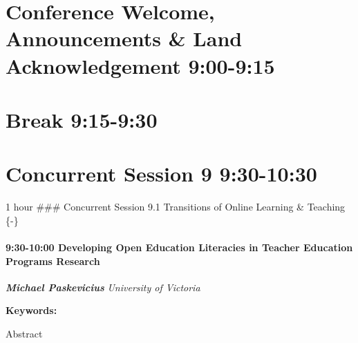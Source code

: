 \documentclass[
]{book}
\begin{document}
\hypertarget{conference-welcome-announcements-land-acknowledgement-900-915-1}{%
\section*{Conference Welcome, Announcements \& Land Acknowledgement \textbar{} 9:00-9:15}\label{conference-welcome-announcements-land-acknowledgement-900-915-1}}

\hypertarget{break-915-930-1}{%
\section*{Break \textbar{} 9:15-9:30}\label{break-915-930-1}}

\hypertarget{concurrent-session-9-930-1030}{%
\section*{Concurrent Session 9 \textbar{} 9:30-10:30}\label{concurrent-session-9-930-1030}}

1 hour
\#\#\# Concurrent Session 9.1 \textbar{} Transitions of Online Learning \& Teaching \{-\}

\begin{session}
\hypertarget{developing-open-education-literacies-in-teacher-education-programs-research}{%
\paragraph*{\texorpdfstring{9:30-10:00 \textbar{} \textbf{Developing
Open Education Literacies in Teacher Education Programs} \textbar{}
Research}{9:30-10:00 \textbar{} Developing Open Education Literacies in Teacher Education Programs \textbar{} Research}}\label{developing-open-education-literacies-in-teacher-education-programs-research}}

\textbf{\emph{Michael Paskevicius}} \textbar{} \emph{University of
Victoria}

\textbf{Keywords:}

Abstract
\end{session}
\end{document}
